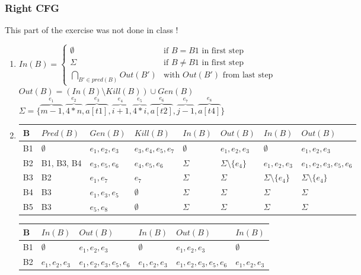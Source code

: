 \documentclass[12pt,fleqn]{article}		%
\begin{document}
\subsubsection{Right CFG}
This part of the exercise was not done in class !
\begin{enumerate}
\item $ In(B) = 
\begin{cases} 
\emptyset & \text{if } B=B1 \text{ in first step}\\
\Sigma & \text{if } B\not= B1 \text{ in first step}\\
\bigcap_{B' \in pred(B)} Out(B') & \text{with } Out(B') \text{ from last step}
\end{cases}$\\
$Out(B) = (In(B) \setminus Kill(B)) \cup Gen(B)$\\
$\Sigma = \{\overbrace{m-1}^{e_1}, \overbrace{4*n}^{e_2}, \overbrace{a[t1]}^{e_3}, \overbrace{i+1}^{e_4}, \overbrace{4*i}^{e_5}, \overbrace{a[t2]}^{e_6}, \overbrace{j-1}^{e_7}, \overbrace{a[t4]}^{e_8}\}$
\item 
\begin{tabularx}{\textwidth}{| l | X | X | X || X | X || X | X ||}
\hline
B & $Pred(B) $ & $Gen(B)$ & $Kill(B)$ & $In(B)$ & $Out(B)$ & $In(B)$ & $Out(B)$\\
\hline
B1 & $\emptyset$ & $e_1, e_2, e_3$ & $e_3, e_4, e_5, e_7$ & $\emptyset$ & $e_1, e_2, e_3$ & $\emptyset$ & $e_1, e_2, e_3$ \\
\hline
B2 & B1, B3, B4 & $e_3, e_5, e_6$ & $e_4, e_5, e_6$ & $\Sigma$ & $\Sigma \setminus \{e_4\}$ & $e_1, e_2, e_3$ & $e_1, e_2, e_3, e_5, e_6$ \\
\hline
B3 & B2 & $e_1, e_7$ & $e_7$ & $\Sigma$ & $\Sigma$ & $\Sigma \setminus \{e_4\}$ & $\Sigma \setminus \{e_4\}$ \\
\hline
B4 & B3 & $e_1, e_3, e_5$ & $\emptyset$ & $\Sigma$ & $\Sigma$ & $\Sigma$ & $\Sigma$ \\
\hline
B5 & B3 & $e_5, e_8$ & $\emptyset$ & $\Sigma$ & $\Sigma$ & $\Sigma$ & $\Sigma$ \\
\hline
\end{tabularx}
\begin{tabularx}{\textwidth}{| l || X | X || X | X || X |}
\hline
B & $In(B)$ & $Out(B)$ & $In(B)$ & $Out(B)$ & $In(B)$\\
\hline
B1 & $\emptyset$ & $e_1, e_2, e_3$ & $\emptyset$ & $e_1, e_2, e_3$ & $\emptyset$\\
\hline
B2 & $e_1, e_2, e_3$ & $e_1, e_2, e_3, e_5, e_6$ & $e_1, e_2, e_3$ & $e_1, e_2, e_3, e_5, e_6$ & $e_1, e_2, e_3$\\

\end{tabularx}
\end{enumerate}
\end{document}
